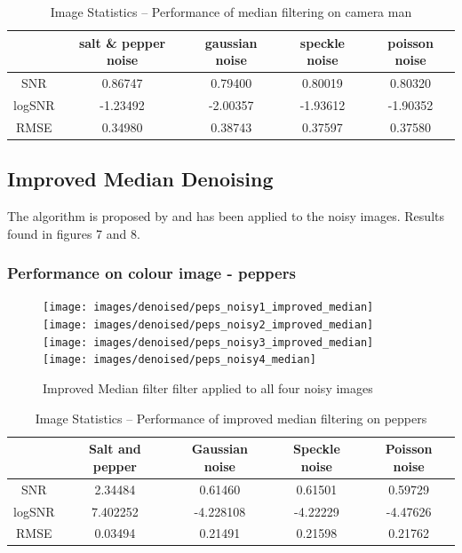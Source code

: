 \documentclass{article}
\begin{document}
\begin{table}[H]
  \centering
  \begin{tabular}{c|c|c|c|c}
    & salt \& pepper noise & gaussian noise &speckle noise & poisson noise\\
    \hline
    SNR    & 0.86747  & 0.79400  & 0.80019  & 0.80320  \\
    logSNR & -1.23492 & -2.00357 & -1.93612 & -1.90352 \\
    RMSE   & 0.34980  & 0.38743  & 0.37597  & 0.37580  \\
  \end{tabular}
  \caption{Image Statistics -- Performance of median filtering on camera
    man}
\end{table}
%
\subsection{Improved Median Denoising}
\label{subsec:improve-median-denoise}
The algorithm is proposed by \cite{improved-median} and
\cite{Med2012} has been applied to the noisy images. Results found
in figures 7 and 8.
\subsubsection{Performance on colour image - peppers}
\begin{figure}[H]
  \centering
  \texttt{[image: images/denoised/peps\_noisy1\_improved\_median]}
  \texttt{[image: images/denoised/peps\_noisy2\_improved\_median]}
  \texttt{[image: images/denoised/peps\_noisy3\_improved\_median]}
  \texttt{[image: images/denoised/peps\_noisy4\_median]}
  \caption{Improved Median filter filter applied to all four noisy images}
\end{figure}
\begin{table}[H]
  \centering
  \begin{tabular}{c|c|c|c|c}
    & Salt and pepper & Gaussian noise & Speckle noise & Poisson noise \\
    \hline
    SNR    & 2.34484  & 0.61460   & 0.61501  & 0.59729  \\
    logSNR & 7.402252 & -4.228108 & -4.22229 & -4.47626 \\
    RMSE   & 0.03494  & 0.21491   & 0.21598  & 0.21762  \\
  \end{tabular}
  \caption{Image Statistics -- Performance of improved median
    filtering on peppers}
\end{table}
%
\end{document}
